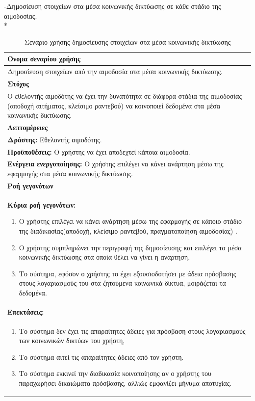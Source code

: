 \newpage
-Δημοσίευση στοιχείων στα μέσα κοινωνικής δικτύωσης σε κάθε στάδιο της αιμοδοσίας.
\\*
\begin{table}[H]	
	\begin{center}
	    \begin{tabular}{|p{\dimexpr \linewidth-2\tabcolsep}|}
	    \hline
	    \rowcolor{grayy}
	    \textbf{Όνομα σεναρίου χρήσης}
	    \\ \hline    
	    Δημοσίευση στοιχείων από την αιμοδοσία στα μέσα κοινωνικής δικτύωσης.
	     \\ \hline
	    \rowcolor{grayy}
	   \textbf{Στόχος}
	    \\ \hline
	 	 Ο εθελοντής αιμοδότης να έχει την δυνατότητα σε διάφορα στάδια της αιμοδοσίας (αποδοχή αιτήματος, κλείσιμο ραντεβού) να κοινοποιεί δεδομένα στα μέσα κοινωνικής δικτύωσης.
	    \\ \hline
	    \rowcolor{grayy}
	    \textbf{Λεπτομέρειες}
	    \\ \hline
		\textbf{Δράστης:} Εθελοντής αιμοδότης.
		\\*
		\textbf{Προϋποθέσεις:} Ο χρήστης να έχει αποδεχτεί κάποια αιμοδοσία.
		\\*
		\textbf{Ενέργεια ενεργοποίησης:} Ο χρήστης επιλέγει να κάνει ανάρτηση μέσω της εφαρμογής στα μέσα κοινωνικής δικτύωσης.
		\\ \hline
		\rowcolor{grayy}    
	    \textbf{Ροή γεγονότων}
	    \\ \hline
		\textbf{Κύρια ροή γεγονότων:}
		\begin{enumerate}
		\item	 Ο χρήστης επιλέγει να κάνει ανάρτηση μέσω της εφαρμογής σε κάποιο στάδιο της διαδικασίας(αποδοχή, κλείσιμο ραντεβού, πραγματοποίηση αιμοδοσίας) .
		\item Ο χρήστης συμπληρώνει την περιγραφή της δημοσίευσης και επιλέγει τα μέσα κοινωνικής δικτύωσης στα οποία θέλει να γίνει η ανάρτηση.
	   \item Το σύστημα, εφόσον ο χρήστης το έχει εξουσιοδοτήσει με άδεια πρόσβασης στους λογαριασμούς του στα ζητούμενα κοινωνικά δίκτυα, μοιράζεται τα δεδομένα.
		\end{enumerate}
		\\ \hline
		\rowcolor{grayy}
		\textbf{Επεκτάσεις:}
		   \\ \hline
		\begin{enumerate}
			\item Το σύστημα δεν έχει τις απαραίτητες άδειες για πρόσβαση στους λογαριασμούς των κοινωνικών δικτύων του χρήστη,
			\item Το σύστημα αιτεί τις απαραίτητες άδειες από τον χρήστη.
			\item Το σύστημα εκκινεί την διαδικασία κοινοποίησης αν ο χρήστης του παραχωρήσει δικαιώματα πρόσβασης, αλλιώς εμφανίζει μήνυμα αποτυχίας.
		\end{enumerate}
		\\ \hline
	    \end{tabular}
	    \caption{Σενάριο χρήσης δημοσίευσης στοιχείων στα μέσα κοινωνικής δικτύωσης}
	    \label{tab:share_to_social_media} 
	\end{center}
\end{table}		

